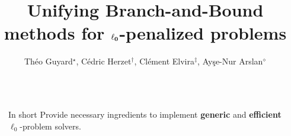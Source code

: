 \documentclass[final]{beamer}
\title{Unifying Branch-and-Bound methods for $\mathbf{\ell}_{\mathbf{0}}$-penalized problems}
\author{Théo Guyard${}^{\star}$, Cédric Herzet${}^{\dagger}$, Clément Elvira${}^{\ddagger}$, Ay\c{s}e-Nur Arslan${}^{\diamond}$}
\institute{${}^{\star}$Inria and Insa Rennes, ${}^{\dagger}$Ensai, ${}^{\ddagger}$CentraleSupélec, ${}^{\diamond}$Inria Bordeaux}
\newlength{\sepwid}
\newlength{\onecolwid}
\newcommand{\emphone}[1]{\textbf{\color{norange}#1}}
\begin{document}

\setlength{\belowcaptionskip}{2ex}
\setlength\belowdisplayshortskip{2ex}

\begin{frame}[t]

\begin{columns}[t]

\begin{column}{\sepwid}\end{column}

\begin{column}{\onecolwid}

    \begin{alertblock}{In short}
        \centering
        Provide necessary ingredients to implement \emphone{generic} and \emphone{efficient} $\ell_0$-problem solvers.
    \end{alertblock}


\end{column}
\end{columns}
\end{frame}
\end{document}

